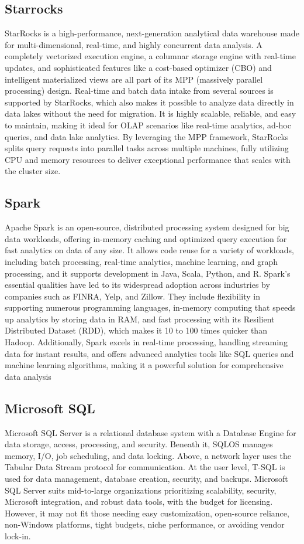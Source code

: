     \subsection{Starrocks}
    StarRocks is a high-performance, next-generation analytical data warehouse made for multi-dimensional, real-time, and highly concurrent data analysis. A completely vectorized execution engine, a columnar storage engine with real-time updates, and sophisticated features like a cost-based optimizer (CBO) and intelligent materialized views are all part of its MPP (massively parallel processing) design. Real-time and batch data intake from several sources is supported by StarRocks, which also makes it possible to analyze data directly in data lakes without the need for migration.  It is highly scalable, reliable, and easy to maintain, making it ideal for OLAP scenarios like real-time analytics, ad-hoc queries, and data lake analytics. By leveraging the MPP framework, StarRocks splits query requests into parallel tasks across multiple machines, fully utilizing CPU and memory resources to deliver exceptional performance that scales with the cluster size. 
    \cite{StarRocks}
    \subsection{Spark}
    Apache Spark is an open-source, distributed processing system designed for big data workloads, offering in-memory caching and optimized query execution for fast analytics on data of any size. It allows code reuse for a variety of workloads, including batch processing, real-time analytics, machine learning, and graph processing, and it supports development in Java, Scala, Python, and R. Spark's essential qualities have led to its widespread adoption across industries by companies such as FINRA, Yelp, and Zillow. They include flexibility in supporting numerous programming languages, in-memory computing that speeds up analytics by storing data in RAM, and fast processing with its Resilient Distributed Dataset (RDD), which makes it 10 to 100 times quicker than Hadoop. Additionally, Spark excels in real-time processing, handling streaming data for instant results, and offers advanced analytics tools like SQL queries and machine learning algorithms, making it a powerful solution for comprehensive data analysis
    \cite{Joseph}
    \subsection{Microsoft SQL}
    Microsoft SQL Server is a relational database system with a Database Engine for data storage, access, processing, and security. Beneath it, SQLOS manages memory, I/O, job scheduling, and data locking. Above, a network layer uses the Tabular Data Stream protocol for communication. At the user level, T-SQL is used for data management, database creation, security, and backups. Microsoft SQL Server suits mid-to-large organizations prioritizing scalability, security, Microsoft integration, and robust data tools, with the budget for licensing. However, it may not fit those needing easy customization, open-source reliance, non-Windows platforms, tight budgets, niche performance, or avoiding vendor lock-in.
    
